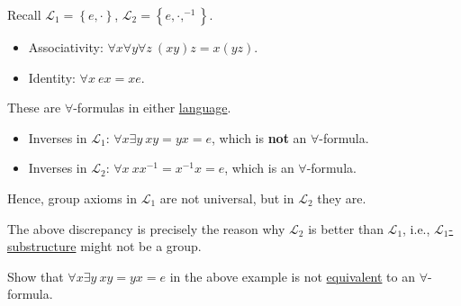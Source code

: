 \begin{eg}
	Recall \(\mathcal{L} _1 = \left\{ e, \cdot \right\} \), \(\mathcal{L} _2=\left\{ e, \cdot, ^{-1} \right\} \).
	\begin{itemize}
		\item Associativity: \(\forall x \forall y \forall z\ (xy)z = x(yz)\).
		\item Identity: \(\forall x\ ex = xe\).
	\end{itemize}
	These are \(\forall \)-formulas in either \hyperref[def:language]{language}.
	\begin{itemize}
		\item Inverses in \(\mathcal{L} _1\): \(\forall x \exists y\ xy = yx = e\), which is \textbf{not} an \(\forall \)-formula.
		\item Inverses in \(\mathcal{L} _2\): \(\forall x\ x x ^{-1} = x ^{-1} x = e\), which is an \(\forall \)-formula.
	\end{itemize}
	Hence, group axioms in \(\mathcal{L} _1\) are not universal, but in \(\mathcal{L} _2\) they are.
\end{eg}

\begin{remark}
	The above discrepancy is precisely the reason why \(\mathcal{L} _2\) is better than \(\mathcal{L} _1\), i.e., \hyperref[def:substructure]{\(\mathcal{L} _1\)-substructure} might not be a group.
\end{remark}

\begin{problem*}
	Show that \(\forall x \exists y\ xy = yx = e\) in the above example is not \hyperref[def:equivalent]{equivalent} to an \(\forall \)-formula.
\end{problem*}